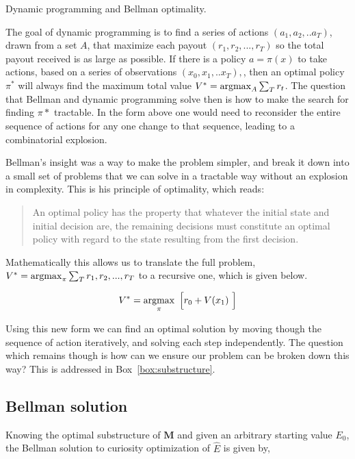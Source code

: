 \begin{featurebox}
	\caption{Dynamic programming and Bellman optimality.}
	\label{box:bellman}
	The goal of dynamic programming is to find a series of actions $(a_1, a_2, ..a_T)$, drawn from a set $A$, that maximize each payout $(r_1, r_2, ..., r_{T})$ so the total payout received is as large as possible. If there is a policy $a = \pi(x)$ to take actions, based on a series of observations $(x_0, x_1, ..x_{T}),$, then an optimal policy $\pi^*$ will always find the maximum total value $V^* = \operatorname*{argmax}_{A} \sum_T r_t $. The question that Bellman and dynamic programming solve then is how to make the search for finding $\pi*$ tractable. In the form above one would need to reconsider the entire sequence of actions for any one change to that sequence, leading to a combinatorial explosion. 
	
	Bellman's insight was a way to make the problem simpler, and break it down into a small set of problems that we can solve in a tractable way without an explosion in complexity. This is his principle of optimality, which reads:

	\begin{quote}
		An optimal policy has the property that whatever the initial state and initial decision are, the remaining decisions must constitute an optimal policy with regard to the state resulting from the first decision. \citep{Bellmann1954}
	\end{quote}

	Mathematically this allows us to translate the full problem, $V^* = \operatorname*{argmax}_{\pi} \sum_T r_1, r_2, ..., r_{T}$ to a recursive one, which is given below. 

	\begin{equation}
		V^* = \operatorname*{argmax}_{\pi} \ \Big [ r_0 + V(x_1) \ \Big ]
	\end{equation}
	
	Using this new form we can find an optimal solution by moving though the sequence of action iteratively, and solving each step independently. The question which remains though is how can we ensure our problem can be broken down this way? This is addressed in Box~\ref{box:substructure}.
	\medskip
\end{featurebox}


\subsection*{Bellman solution} Knowing the optimal substructure of $\mathbf{M}$ and given an arbitrary starting value $E_0$, the Bellman solution to curiosity optimization of $\hat E$ is given by,


